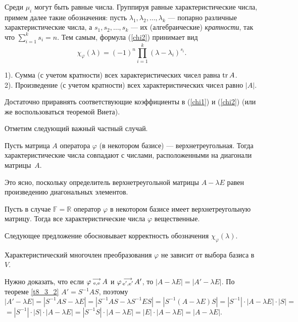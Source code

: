 Среди $\mu_i$ могут быть равные числа. Группируя равные характеристические числа, примем далее
такие обозначения: пусть $\lambda _1, \lambda _2, \ldots , \lambda _k $
--- попарно различные характеристические числа, а $s_1, s_2, \ldots , s_k$ ---
их (алгебраические) {\it кратности}, так что $\sum\limits_{i=1}^k s_i = n$. Тем самым, формула 
(\ref{chi2}) принимает вид
\begin{equation}\label{chi3}
\chi_{\varphi}(\lambda) = (-1)^n \prod\limits_{i=1}^k (\lambda - \lambda _i)^{s_i}.
\end{equation}

\begin{predl}\label{p8_5_00}
1). Сумма (с учетом кратности) всех характеристических чисел равна $\mathop{\rm tr}\nolimits A$.\\
2). Произведение (с учетом кратности) всех характеристических чисел равно $|A|$.
\end{predl}
\dok Достаточно приравнять  
соответствующие коэффициенты в (\ref{chi1}) и (\ref{chi2}) (или же воспользоваться теоремой Виета).
\edok

\otstup

Отметим следующий важный частный случай.

\begin{predl}\label{p8_5_99}
Пусть  матрица $A$ оператора $\varphi$ (в некотором базисе) --- верхнетреугольная. Тогда
характеристические числа совпадают с числами, расположенными на диагонали матрицы~$A$. 
\end{predl}
\dok Это ясно, поскольку  определитель верхнетреугольной матрицы $A-\lambda E$
равен произведению диагональных элементов.
\edok


\begin{sled}%
Пусть в случае $\mathbb{F}=\mathbb{R}$ оператор $\varphi$ в некотором базисе 
имеет верхнетреугольную матрицу. Тогда все характеристические числа $\varphi$
вещественные. 
\end{sled}


\otstup

Следующее предложение обосновывает корректность обозначения
$\chi_{\varphi}(\lambda)$. %

\begin{predl}\label{p8_5_9}
Характеристический многочлен 
преобразования $\varphi$ не зависит от выбора базиса в $V$.
\end{predl}
\dok Нужно доказать, что если $\varphi \begin{smallmatrix} \longrightarrow \\ \mathrm{e}, \mathrm{e} \end{smallmatrix} A$ 
и $\varphi \begin{smallmatrix} \longrightarrow \\ \mathrm{e'}, \mathrm{e'} \end{smallmatrix} A'$, 
то $|A-\lambda E|= |A'-\lambda E|$. 
По теореме \ref{t8_3_2} 
$A'=S^{-1}AS$, поэтому \\ $|A'-\lambda E| = |S^{-1}AS-\lambda E| = |S^{-1}AS-\lambda S^{-1}ES| =
|S^{-1}(A-\lambda E) S| = 
|S^{-1}|\cdot |A-\lambda E|\cdot | S| = $ \\
$=|S^{-1}|\cdot | S| \cdot |A-\lambda E| = |S^{-1}  S| \cdot |A-\lambda E| = |E| \cdot |A-\lambda E|=|A-\lambda E|.$
\edok

